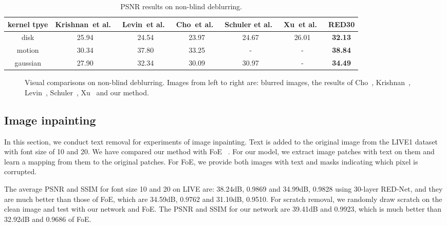 \documentclass[10pt,journal,compsoc]{IEEEtran}
\begin{document}
\begin{table*}[htb]
\centering
\caption{PSNR results on non-blind deblurring.}
\begin{tabular}{c|c c c c c c} \hline
  kernel tpye  &Krishnan~et al.~\cite{DBLP:conf/nips/KrishnanF09}
  &Levin~et al.~\cite{DBLP:journals/tog/LevinFDF07}
               &Cho~et al.~\cite{DBLP:conf/iccv/ChoWL11}
               &Schuler et al.~\cite{DBLP:conf/cvpr/SchulerBHS13}
               &Xu~et al.~\cite{DBLP:conf/nips/XuRLJ14}    &RED30	\\ \hline
  disk    	&25.94  &24.54  &23.97  &24.67  &26.01  &\textbf{32.13}	\\ \hline
  motion    &30.34  &37.80  &33.25  &-      &-      &\textbf{38.84}	\\ \hline
  gaussian  &27.90  &32.34  &30.09  &30.97  &-      &\textbf{34.49}	\\ \hline
 \end{tabular}
\label{table10}
\end{table*}




\begin{figure*}
\centering
{}
\caption{Visual comparisons on non-blind deblurring. Images from left to right are:
blurred images, the results of Cho~\cite{DBLP:conf/iccv/ChoWL11},
Krishnan~\cite{DBLP:conf/nips/KrishnanF09}, Levin~\cite{DBLP:journals/tog/LevinFDF07},
Schuler~\cite{DBLP:conf/cvpr/SchulerBHS13}, Xu~\cite{DBLP:conf/nips/XuRLJ14}
and our method.}
\label{fig17}
\end{figure*}




\subsection{Image inpainting}
In this section,
we conduct text removal for experiments of image inpainting. Text is added
to the original image from the LIVE1 dataset  with font size of 10 and 20.
We have compared our method with FoE ~\cite{DBLP:journals/ijcv/RothB09}. For our model,
we extract image patches with text on them and learn a mapping from them to the
original patches. For FoE, we provide both images with text and masks indicating
which pixel is corrupted.

The average PSNR and SSIM for font size 10 and 20 on LIVE are:
38.24dB, 0.9869 and 34.99dB, 0.9828 using 30-layer RED-Net, and they are much
better than those of FoE, which are 34.59dB, 0.9762 and 31.10dB, 0.9510. For scratch
removal, we randomly draw scratch on the clean image and test with our network and FoE. The PSNR and SSIM for our network are 39.41dB and 0.9923, which is much better than 32.92dB and 0.9686 of FoE.
\end{document}
